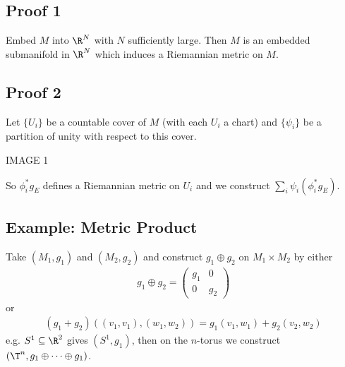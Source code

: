 \documentclass[11pt]{article}
\begin{document}
\subsection*{Proof 1}
\label{sec:org6bea0f6}
Embed \(M\) into \(\R^{N}\) with \(N\) sufficiently large. Then \(M\) is an embedded submanifold in \(\R^{N}\) which induces a Riemannian metric on \(M\).\\
\subsection*{Proof 2}
\label{sec:org86c0909}
Let \(\{U_{i}\}\) be a countable cover of \(M\) (with each \(U_{i}\) a chart) and \(\{\psi_{i}\}\) be a partition of unity with respect to this cover.\\
\begin{center}
IMAGE 1\\
\end{center}
So \(\phi_{i}^{*}g_{E}\) defines a Riemannian metric on \(U_{i}\) and we construct \(\sum_{i}\psi_{i}(\phi_{i}^{*}g_{E})\).\\
\subsection*{Example: Metric Product}
\label{sec:org84d72d1}
Take \((M_{1},g_{1})\) and \((M_{2},g_{2})\) and construct \(g_{1}\oplus g_{2}\) on \(M_{1}\times M_{2}\) by either\\
\begin{align*}
  g_{1}\oplus g_{2}=
  \begin{pmatrix}
    g_{1} & 0 \\
    0 & g_{2}
  \end{pmatrix}
\end{align*}
or\\
\begin{align*}
  (g_{1}+g_{2})((v_{1},v_{1}),(w_{1},w_{2}))
  =g_{1}(v_{1},w_{1})+g_{2}(v_{2},w_{2})
\end{align*}
e.g. \(S^{1}\subseteq\R^{2}\) gives \((S^{1},g_{1})\), then on the \(n\)-torus we construct \((\T^{n},g_{1}\oplus\cdots\oplus g_{1})\).\\
\end{document}
